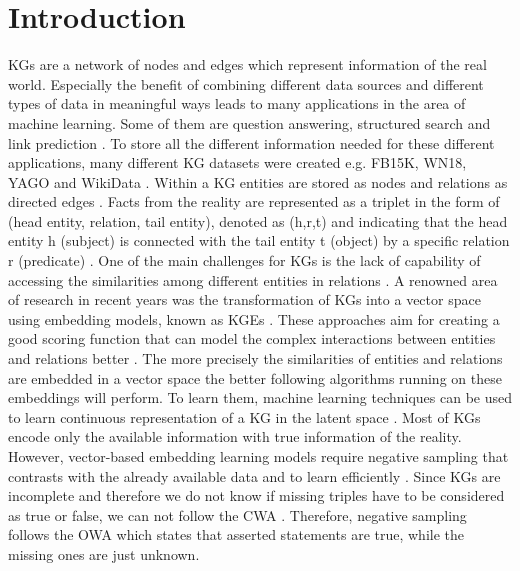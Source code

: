 \chapter{Introduction}
\label{ch:introduction}

\acp{KG} are a network of nodes and edges which represent information of the real world. 
Especially the benefit of combining different data sources and different types of data in meaningful ways leads to many applications in the area of machine learning.
Some of them are question answering, structured search \cite{zhang2019nscaching} and link prediction \cite{cai2017kbgan, Alam2020AffinityDN}.
To store all the different information needed for these different applications, many different \ac{KG} datasets were created e.g. FB15K, WN18, YAGO \cite{ConEx} and WikiData \cite{arnaoutwikinegata}.
Within a \ac{KG} entities are stored as nodes and relations as directed edges \cite{zhang2019nscaching}.
Facts from the reality are represented as a triplet in the form of (head entity, relation, tail entity), denoted as (h,r,t) and indicating that the head entity h (subject) is connected with the tail entity t (object) by a specific relation r (predicate) \cite{zhang2019nscaching, Alam2020AffinityDN}.
One of the main challenges for \acp{KG} is the lack of capability of accessing the similarities among different entities in relations \cite{cai2017kbgan}. 
A renowned area of research in recent years was the transformation of \acp{KG} into a vector space using embedding models, known as \acp{KGE} \cite{Alam2020AffinityDN}.
These approaches aim for creating a good scoring function that can model the complex interactions between entities and relations better \cite{zhang2019nscaching}.
The more precisely the similarities of entities and relations are embedded in a vector space the better following algorithms running on these embeddings will perform.
To learn them, machine learning techniques can be used to learn continuous representation of a \ac{KG} in the latent space \cite{cai2017kbgan}. 
Most of \acp{KG} encode only the available information with true information of the reality.
However, vector-based embedding learning models require negative sampling that contrasts with the already available data and to learn efficiently \cite{Alam2020AffinityDN}.
Since \acp{KG} are incomplete and therefore we do not know if missing triples have to be considered as true or false, we can not follow the \ac{CWA} \cite{arnaout2020enriching}.
Therefore, negative sampling follows the \ac{OWA} which states that asserted statements are true, while the missing ones are just unknown.

